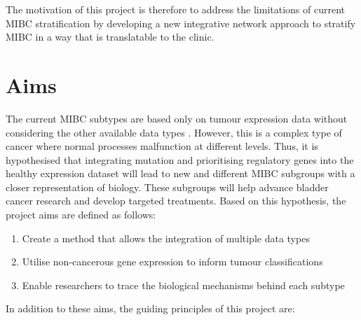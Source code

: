 The motivation of this project is therefore to address the limitations of current \gls{MIBC} stratification by developing a new integrative network approach to stratify \gls{MIBC} in a way that is translatable to the clinic.




\section{Aims} \label{s:intro:aims}



The current MIBC subtypes are based only on tumour expression data without considering the other available data types \citep{Kamoun2020-tj, Robertson2017-mg}. However, this is a complex type of cancer where normal processes malfunction at different levels. Thus, it is hypothesised that integrating mutation and prioritising regulatory genes into the healthy expression dataset will lead to new and different MIBC subgroups with a closer representation of biology. These subgroups will help advance bladder cancer research and develop targeted treatments. Based on this hypothesis, the project aims are defined as follows:

\begin{enumerate}
    \item Create a method that allows the integration of multiple data types
    \item Utilise non-cancerous gene expression to inform tumour classifications
    \item Enable researchers to trace the biological mechanisms behind each subtype
\end{enumerate}

In addition to these aims, the guiding principles of this project are:

